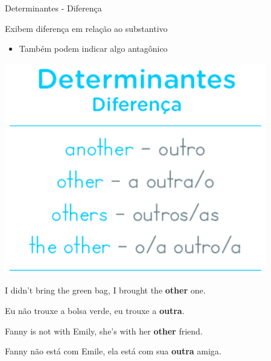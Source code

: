 \documentclass[compress,mathserif,xcolor=table]{beamer}
\begin{document}

\begin{frame}{Determinantes - Diferença}

\begin{minipage}{.44\textwidth}
Exibem diferença em relação ao substantivo
\begin{itemize}
    \item Também podem indicar algo antagônico
\end{itemize}
\end{minipage}
\begin{minipage}{.54\textwidth}
\includegraphics[width=\linewidth]{images/determinantes_diferenca.png}
\end{minipage}

\vspace{0.5cm}

I didn’t bring the green bag, I brought the \textbf{other} one.

Eu não trouxe a bolsa verde, eu trouxe a \textbf{outra}.

\vspace{0.15cm}

Fanny is not with Emily, she’s with her \textbf{other} friend.

Fanny não está com Emile, ela está com sua \textbf{outra} amiga.

\end{frame}

\end{document}
